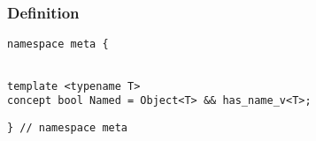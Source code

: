 
\subsubsection{Definition}

\begin{verbatim}
namespace meta {
\end{verbatim}
\begin{verbatim}

template <typename T>
concept bool Named = Object<T> && has_name_v<T>;

\end{verbatim}
\begin{verbatim}
} // namespace meta
\end{verbatim}
